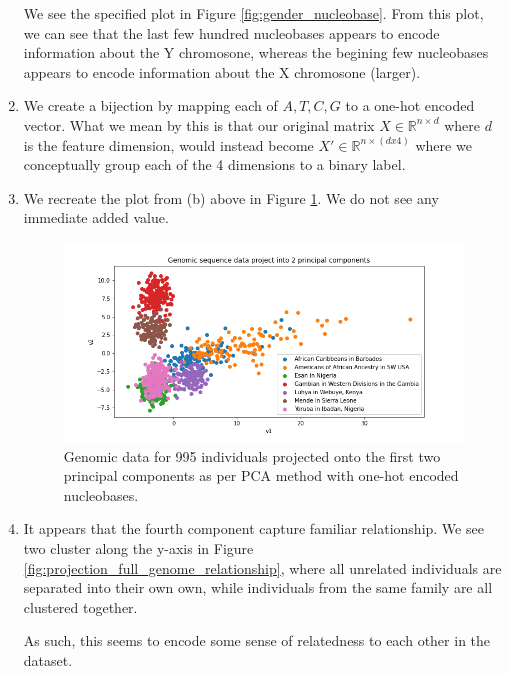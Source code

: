 \documentclass[12pt]{article}
\begin{document}
\begin{enumerate}[label=(\alph*)]
    We see the specified plot in Figure \ref{fig:gender_nucleobase}. From this plot, we can see that the last few hundred nucleobases appears to encode information about the Y chromosone, whereas the begining few nucleobases appears to encode information about the X chromosone (larger).

  \item
    We create a bijection by mapping each of $A,T,C,G$ to a one-hot encoded vector. What we mean by this is that our original matrix $X \in \mathbb{R}^{n \times d}$ where $d$ is the feature dimension, would instead become $X' \in \mathbb{R}^{n \times (d x 4)}$ where we conceptually group each of the 4 dimensions to a binary label. 

  \item
    We recreate the plot from (b) above in Figure \ref{fig:projection_full_genome}. We do not see any immediate added value.

    \begin{figure}[!ht]
      \centering
      \includegraphics[scale=0.5]{figures/genomic_2d_projection_use_mode=False.png}
      \caption{Genomic data for 995 individuals projected onto the first two principal components as per PCA method with one-hot encoded nucleobases.}
      \label{fig:projection_full_genome}
    \end{figure}

  \item
    It appears that the fourth component capture familiar relationship. We see two cluster along the y-axis in Figure \ref{fig:projection_full_genome_relationship}, where all unrelated individuals are separated into their own own, while individuals from the same family are all clustered together.

    As such, this seems to encode some sense of relatedness to each other in the dataset.


\end{enumerate}
\end{document}
